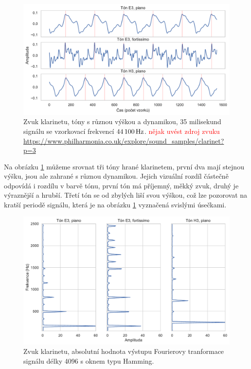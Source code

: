\begin{figure}[h]\centering
\includegraphics[width=\textwidth,height=\textheight,keepaspectratio]{../img/audio_clarinet}
\caption{Zvuk klarinetu, tóny s různou výškou a dynamikou, 35 milisekund signálu se vzorkovací frekvencí $44\,100\,\rm Hz$. \textcolor{red}{nějak uvést zdroj zvuku \url{https://www.philharmonia.co.uk/explore/sound_samples/clarinet?p=3}}}
\label{obr:audio_clarinet}
\end{figure}

Na obrázku \ref{obr:audio_clarinet} můžeme srovnat tři tóny hrané klarinetem, první dva mají stejnou výšku, jsou ale zahrané s různou dynamikou. Jejich vizuální rozdíl částečně odpovídá i rozdílu v barvě tónu, první tón má příjemný, měkký zvuk, druhý je výraznější a hrubší. Třetí tón se od zbylých liší svou výškou, což lze pozorovat na kratší periodě signálu, která je na obrázku \ref{obr:audio_clarinet} vyznačená svislými úsečkami. 

\begin{figure}[h]\centering
\includegraphics[width=\textwidth,height=\textheight,keepaspectratio]{../img/audio_clarinet_dft}
\caption{Zvuk klarinetu, absolutní hodnota výstupu Fourierovy tranformace signálu délky 4096 s oknem typu Hamming.}
\label{obr:audio_clarinet_dft}
\end{figure}

